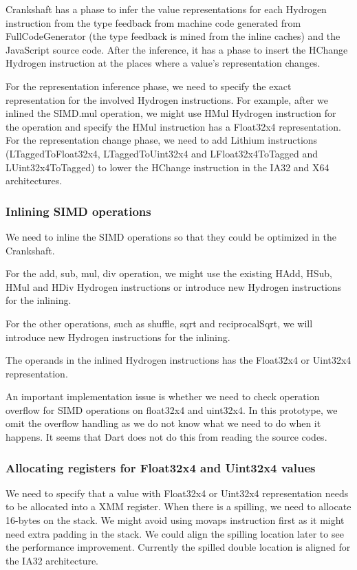 \documentclass[12pt]{article} %
\begin{document}
Crankshaft has a phase to infer the value representations for each Hydrogen
instruction from the type feedback from machine code generated from
FullCodeGenerator (the type feedback is mined from the inline caches) and the
JavaScript source code. After the inference, it has a phase to insert the
HChange Hydrogen instruction at the places where a value's representation
changes.

For the representation inference phase, we need to specify the exact
representation for the involved Hydrogen instructions. For example, after we
inlined the SIMD.mul operation, we might use HMul Hydrogen instruction for the
operation and specify the HMul instruction has a Float32x4 representation. For
the representation change phase, we need to add Lithium instructions
(LTaggedToFloat32x4, LTaggedToUint32x4 and LFloat32x4ToTagged and
LUint32x4ToTagged) to lower the HChange instruction in the IA32 and X64
architectures.

\subsubsection{Inlining SIMD operations}
We need to inline the SIMD operations so that they could be optimized in the
Crankshaft.

For the add, sub, mul, div operation, we might use the existing HAdd, HSub,
HMul and HDiv Hydrogen instructions or introduce new Hydrogen instructions for
the inlining.

For the other operations, such as shuffle, sqrt and reciprocalSqrt, we will
introduce new Hydrogen instructions for the inlining.

The operands in the inlined Hydrogen instructions has the Float32x4 or Uint32x4
representation.

An important implementation issue is whether we need to check operation
overflow for SIMD operations on float32x4 and uint32x4. In this prototype, we
omit the overflow handling as we do not know what we need to do when it
happens. It seems that Dart does not do this from reading the source codes.

\subsubsection{Allocating registers for Float32x4 and Uint32x4 values}
We need to specify that a value with Float32x4 or Uint32x4 representation needs
to be allocated into a XMM register. When there is a spilling, we need to
allocate 16-bytes on the stack. We might avoid using movaps instruction first
as it might need extra padding in the stack. We could align the spilling
location later to see the performance improvement. Currently the spilled double
location is aligned for the IA32 architecture.
\end{document}
